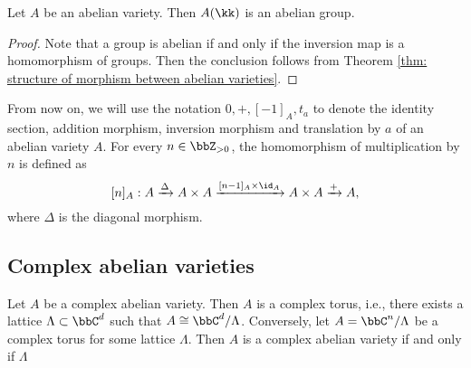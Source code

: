     \begin{proposition}\label{prop: abelian varieties are abelian groups}
        Let \( A \) be an abelian variety. 
        Then \( A(\kk) \) is an abelian group.
    \end{proposition}
    \begin{proof}
        Note that a group is abelian if and only if the inversion map is a homomorphism of groups.
        Then the conclusion follows from Theorem \ref{thm: structure of morphism between abelian varieties}.
    \end{proof}

    From now on, we will use the notation \(0, +, [-1]_A, t_a\) to denote the identity section, addition morphism, inversion morphism and translation by \(a\) of an abelian variety \(A\).
    For every \(n \in \bbZ_{>0}\), the homomorphism of multiplication by \(n\) is defined as 
    \[ [n]_A: A \xrightarrow{\Delta} A \times A \xrightarrow{[n-1]_A\times \id_A} A \times A \xrightarrow{+} A, \]
    where \(\Delta\) is the diagonal morphism.


\subsection{Complex abelian varieties}

    \begin{theorem}\label{thm: complex abelian varieties are complex tori}
        Let \(A\) be a complex abelian variety.
        Then \(A\) is a complex torus, i.e., there exists a lattice \(\Lambda \subset \bbC^d\) such that \(A \cong \bbC^d / \Lambda\).
        Conversely, let \(A = \bbC^n/\Lambda\) be a complex torus for some lattice \(\Lambda\).
        Then \(A\) is a complex abelian variety if and only if \(\Lambda\)  
    \end{theorem}


